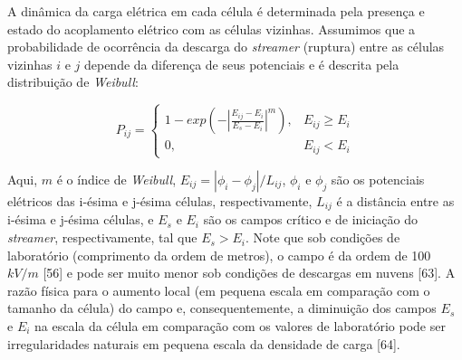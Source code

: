 \documentclass[a4paper, 12pt, onecolumn,singlespacing]{article}
\begin{document}
	A dinâmica da carga elétrica em cada célula é determinada pela presença e estado do acoplamento elétrico com as células vizinhas. Assumimos que a probabilidade de ocorrência da descarga do \textit{streamer} (ruptura) entre as células vizinhas $i$ e $j$ depende da diferença de seus potenciais e é descrita pela distribuição de \textit{Weibull}:
	
	\begin{equation}
		P_{ij} = \begin{cases}
					1 - exp \left( -\left| \frac{E_{ij} - E_i}{E_s - E_i} \right|^m\right ), &  E_{ij} \geq E_i \\ 
					0, & E_{ij} < E_i 
				 \end{cases}
	\end{equation}
	
	Aqui, $m$ é o índice de \textit{Weibull}, $E_{ij} = |\phi_i - \phi_j |/L_{ij}$, $\phi_i$ e $\phi_j$ são os potenciais elétricos das i-ésima e j-ésima células, respectivamente, $L_{ij}$ é a distância entre as i-ésima e j-ésima células, e $E_s$ e $E_i$ são os campos crítico e de iniciação do \textit{streamer}, respectivamente, tal que $E_s > E_i$. Note que sob condições de laboratório (comprimento da ordem de metros), o campo é da ordem de 100 $kV/m$ [56] e pode ser muito menor sob condições de descargas em nuvens [63]. A razão física para o aumento local (em pequena escala em comparação com o tamanho da célula) do campo e, consequentemente, a diminuição dos campos $E_s$ e $E_i$ na escala da célula em comparação com os valores de laboratório pode ser irregularidades naturais em pequena escala da densidade de carga [64].
	
	
\end{document}
